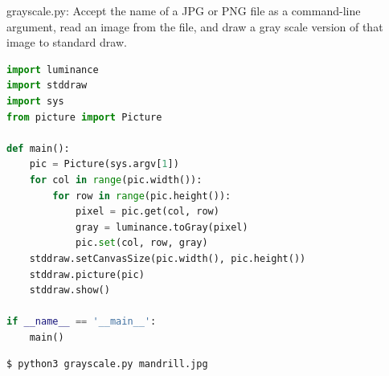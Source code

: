\documentclass[8pt,a4paper,compress]{beamer}
\begin{document}
\begin{frame}[fragile]
\pause

\begin{framed}
\tiny grayscale.py: Accept the name of a JPG or PNG file as a command-line argument, read an image from the file, and draw a gray scale version of that image to standard draw.
\end{framed}

\begin{lstlisting}[language=Python,style=focusin]
import luminance
import stddraw
import sys
from picture import Picture

def main():
    pic = Picture(sys.argv[1])
    for col in range(pic.width()):
        for row in range(pic.height()):
            pixel = pic.get(col, row)
            gray = luminance.toGray(pixel)
            pic.set(col, row, gray)
    stddraw.setCanvasSize(pic.width(), pic.height())
    stddraw.picture(pic)
    stddraw.show()

if __name__ == '__main__':
    main()
\end{lstlisting}

\pause
\bigskip

\begin{minipage}{200pt}
\begin{lstlisting}[language={},style=focusin]
$ python3 grayscale.py mandrill.jpg
\end{lstlisting}
\end{minipage}%
\hfill
\begin{minipage}{100pt}
\begin{center}
\end{center}
\end{minipage}
\end{frame}
\end{document}
